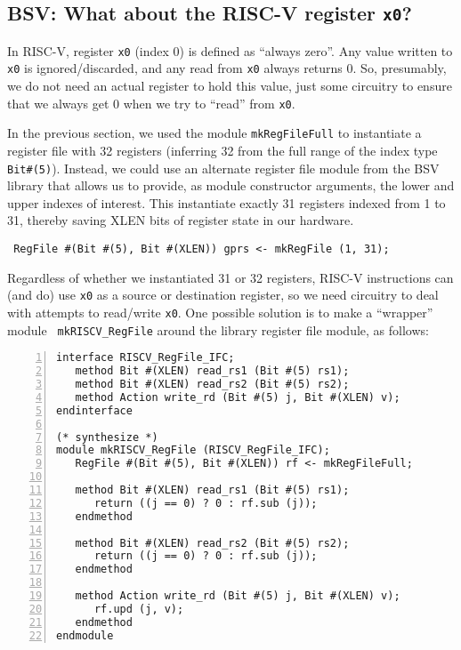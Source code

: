 
\subsection{BSV: What about the RISC-V register {\tt x0}?}


In RISC-V, register \verb|x0| (index 0) is defined as ``always zero''.
Any value written to \verb|x0| is ignored/discarded, and any read from
\verb|x0| always returns 0.  So, presumably, we do not need an actual
register to hold this value, just some circuitry to ensure that we
always get 0 when we try to ``read'' from \verb|x0|.

In the previous section, we used the module \verb|mkRegFileFull| to
instantiate a register file with 32 registers (inferring 32 from the
full range of the index type \verb|Bit#(5)|).  Instead, we could use
an alternate register file module from the BSV library that allows us
to provide, as module constructor arguments, the lower and upper
indexes of interest.  This instantiate exactly 31 registers indexed
from 1 to 31, thereby saving XLEN bits of register state in our
hardware.

\begin{tabbing}\small\tt
\hmm RegFile \#(Bit \#(5), Bit \#(XLEN)) gprs <- mkRegFile (1, 31);
\end{tabbing}

Regardless of whether we instantiated 31 or 32 registers, RISC-V
instructions can (and do) use {\tt x0} as a source or destination
register, so we need circuitry to deal with attempts to read/write
{\tt x0}.  One possible solution is to make a ``wrapper'' module {\tt
mkRISCV\_RegFile} around the library register file module, as follows:


{\small
\begin{Verbatim}[frame=single, numbers=left]
interface RISCV_RegFile_IFC;
   method Bit #(XLEN) read_rs1 (Bit #(5) rs1);
   method Bit #(XLEN) read_rs2 (Bit #(5) rs2);
   method Action write_rd (Bit #(5) j, Bit #(XLEN) v);
endinterface

(* synthesize *)
module mkRISCV_RegFile (RISCV_RegFile_IFC);
   RegFile #(Bit #(5), Bit #(XLEN)) rf <- mkRegFileFull;

   method Bit #(XLEN) read_rs1 (Bit #(5) rs1);
      return ((j == 0) ? 0 : rf.sub (j));
   endmethod

   method Bit #(XLEN) read_rs2 (Bit #(5) rs2);
      return ((j == 0) ? 0 : rf.sub (j));
   endmethod

   method Action write_rd (Bit #(5) j, Bit #(XLEN) v);
      rf.upd (j, v);
   endmethod
endmodule
\end{Verbatim}
}


